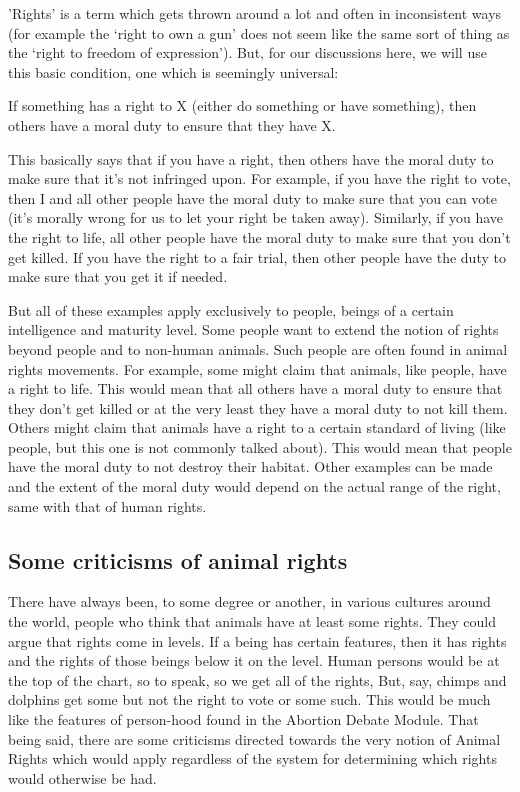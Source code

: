 'Rights’ is a term which gets thrown around a lot and often in inconsistent ways (for example the `right to own a gun' does not seem like the same sort of thing as the `right to freedom of expression'). But, for our discussions here, we will use this basic condition, one which is seemingly universal:

\begin{center}If something has a right to X (either do something or have something), then others have a moral duty to ensure that they have X.\end{center}

This basically says that if you have a right, then others have the moral duty to make sure that it's not infringed upon. For example, if you have the right to vote, then I and all other people have the moral duty to make sure that you can vote (it's morally wrong for us to let your right be taken away). Similarly, if you have the right to life, all other people have the moral duty to make sure that you don't get killed. If you have the right to a fair trial, then other people have the duty to make sure that you get it if needed.

But all of these examples apply exclusively to people, beings of a certain intelligence and maturity level. Some people want to extend the notion of rights beyond people and to non-human animals. Such people are often found in animal rights movements. For example, some might claim that animals, like people, have a right to life. This would mean that all others have a moral duty to ensure that they don't get killed or at the very least they have a moral duty to not kill them. Others might claim that animals have a right to a certain standard of living (like people, but this one is not commonly talked about). This would mean that people have the moral duty to not destroy their habitat. Other examples can be made and the extent of the moral duty would depend on the actual range of the right, same with that of human rights. 
\subsection{Some criticisms of animal rights}

There have always been, to some degree or another, in various cultures around the world, people who think that animals have at least some rights. They could argue that rights come in levels. If a being has certain features, then it has rights and the rights of those beings below it on the level. Human persons would be at the top of the chart, so to speak, so we get all of the rights, But, say, chimps and dolphins get some but not the right to vote or some such. This would be much like the features of person-hood found in the Abortion Debate Module. That being said, there are some criticisms directed towards the very notion of Animal Rights which would apply regardless of the system for determining which rights would otherwise be had. 
